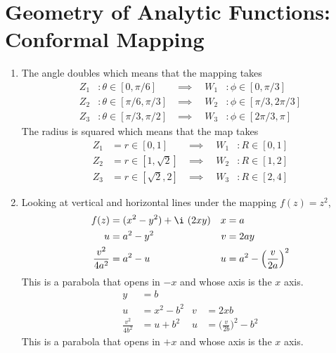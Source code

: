 \section{Geometry of Analytic Functions: Conformal Mapping}

\begin{enumerate}
    \item The angle doubles which means that the mapping takes
          \begin{align}
              Z_1                 & : \theta \in [0, \pi/6]     &
              \implies \quad  W_1 & : \phi \in [0, \pi/3]         \\
              Z_2                 & : \theta \in [\pi/6, \pi/3] &
              \implies \quad  W_2 & : \phi \in [\pi/3, 2\pi/3]    \\
              Z_3                 & : \theta \in [\pi/3, \pi/2] &
              \implies \quad  W_3 & : \phi \in [2\pi/3, \pi]
          \end{align}
          The radius is squared which means that the map takes
          \begin{align}
              Z_1                & = r \in [0,1]        &
              \implies \quad W_1 & : R \in [0, 1]         \\
              Z_2                & = r \in [1,\sqrt{2}] &
              \implies \quad W_2 & : R \in [1, 2]         \\
              Z_3                & = r \in [\sqrt{2},2] &
              \implies \quad W_3 & : R \in [2, 4]
          \end{align}

    \item Looking at vertical and horizontal lines under the mapping
          $ f(z) = z^2 $,
          \begin{align}
              f(z)             & = (x^2 - y^2) + \i\ (2xy)          &
              x                & = a                                  \\
              u                & = a^2 - y^2                        &
              v                & = 2ay                                \\
              \frac{v^2}{4a^2} & = a^2 - u                          &
              u                & = a^2 - \Big( \frac{v}{2a} \Big)^2
          \end{align}
          This is a parabola that opens in $ -x $ and whose axis is the $ x $ axis.
          \begin{align}
              y                & = b                                  \\
              u                & = x^2 - b^2                        &
              v                & = 2xb                                \\
              \frac{v^2}{4b^2} & = u + b^2                          &
              u                & = \Big( \frac{v}{2b} \Big)^2 - b^2
          \end{align}
          This is a parabola that opens in $ +x $ and whose axis is the $ x $ axis.


\end{enumerate}
